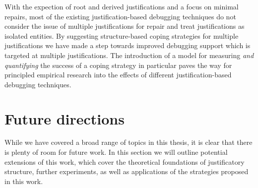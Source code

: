 With the expection of root and derived justifications and a focus on minimal repairs, most of the existing justification-based debugging techniques do not consider the issue of multiple justifications for repair and treat justifications as isolated entities. By suggesting structure-based coping strategies for multiple justifications we have made a step towards improved debugging support which is targeted at multiple justifications. The introduction of a model for measuring \emph{and quantifying} the success of a coping strategy in particular paves the way for principled  empirical research into the effects of different justification-based debugging techniques.


\section{Future directions}

While we have covered a broad range of topics in this thesis, it is clear that there is plenty of room for future work. In this section we will outline potential extensions of this work, which cover the theoretical foundations of justificatory structure, further experiments, as well as applications of the strategies proposed in this work.

